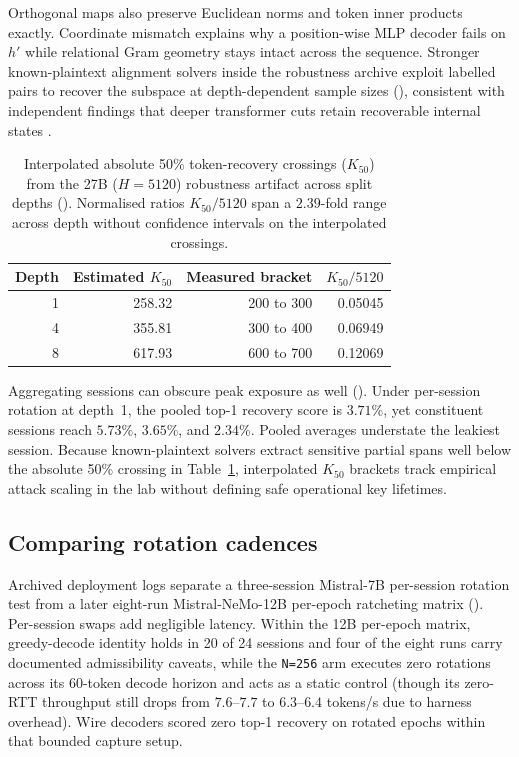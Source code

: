 Orthogonal maps also preserve Euclidean norms and token inner products
exactly. Coordinate mismatch explains why a position-wise MLP decoder fails
on $h'$ while relational Gram geometry stays intact across the sequence.
Stronger known-plaintext alignment solvers inside the robustness archive
exploit labelled pairs to recover the subspace at depth-dependent sample
sizes (), consistent with independent findings that deeper
transformer cuts retain recoverable internal states
\cite{depth2025,actinv2026,bettisplit2026}.

\begin{table}[t]
\centering\small
\begin{tabular}{@{}rrrr@{}}
\toprule
Depth & Estimated $K_{50}$ & Measured bracket & $K_{50}/5120$ \\
\midrule
1 & 258.32 & 200 to 300 & 0.05045 \\
4 & 355.81 & 300 to 400 & 0.06949 \\
8 & 617.93 & 600 to 700 & 0.12069 \\
\bottomrule
\end{tabular}
\caption{Interpolated absolute 50\% token-recovery crossings ($K_{50}$)
from the 27B ($H=5120$) robustness artifact across split depths
(). Normalised ratios $K_{50}/5120$ span a $2.39$-fold range
across depth without confidence intervals on the interpolated crossings.}
\label{tab:k50}
\end{table}

Aggregating sessions can obscure peak exposure as well ().
Under per-session rotation at depth~1, the pooled top-1 recovery score is
$3.71\%$, yet constituent sessions reach $5.73\%$, $3.65\%$, and $2.34\%$.
Pooled averages understate the leakiest session. Because known-plaintext
solvers extract sensitive partial spans well below the absolute 50\%
crossing in Table~\ref{tab:k50}, interpolated $K_{50}$ brackets track
empirical attack scaling in the lab without defining safe operational key
lifetimes.

\subsection{Comparing rotation cadences}

Archived deployment logs separate a three-session Mistral-7B per-session
rotation test from a later eight-run Mistral-NeMo-12B per-epoch ratcheting
matrix (). Per-session swaps add negligible latency. Within
the 12B per-epoch matrix, greedy-decode identity holds in 20 of 24 sessions
and four of the eight runs carry documented admissibility caveats, while
the \texttt{N=256} arm executes zero rotations across its 60-token decode
horizon and acts as a static control (though its zero-RTT throughput still
drops from $7.6$--$7.7$ to $6.3$--$6.4$ tokens/s due to harness overhead).
Wire decoders scored zero top-1 recovery on rotated epochs within that
bounded capture setup.

